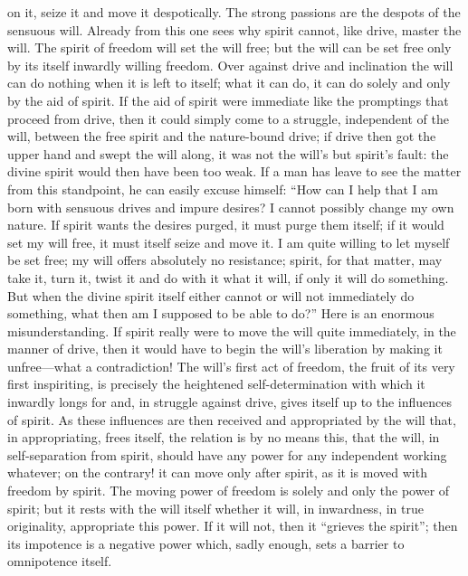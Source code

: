 \documentclass[12pt]{book}
\newcommand{\opage}[1]{\marginnote{\footnotesize\textit{[#1]}}}
\begin{document}
on it, seize it and move it despotically. The strong passions are the
despots of the sensuous will. Already from this one sees why spirit
cannot, like drive, master the will. The spirit of freedom will set the
will free; but the will can be set free only by its itself inwardly
willing freedom. Over against drive and
\opage{11}\setcounter{footnote}{0}%
inclination the will can do nothing when it is left to itself; what it
can do, it can do solely and only by the aid of spirit. If the aid of
spirit were immediate like the promptings that proceed from drive, then
it could simply come to a struggle, independent of the will, between
the free spirit and the nature-bound drive; if drive then got the upper
hand and swept the will along, it was not the will's but spirit's fault:
the divine spirit would then have been too weak. If a man has leave to
see the matter from this standpoint, he can easily excuse himself: ``How
can I help that I am born with sensuous drives and impure desires? I
cannot possibly change my own nature. If spirit wants the desires purged,
it must purge them itself; if it would set my will free, it must itself
seize and move it. I am quite willing to let myself be set free; my will
offers absolutely no resistance; spirit, for that matter, may take it,
turn it, twist it and do with it what it will, if only it will do
something. But when the divine spirit itself either cannot or will not
immediately do something, what then am I supposed to be able to do?''
Here is an enormous misunderstanding. If spirit really were to move the
will quite immediately, in the manner of drive, then it would have to
begin the will's liberation by making it unfree---what a contradiction!
The will's first act of freedom, the fruit of its very first
inspiriting, is precisely the heightened self-determination with which
it inwardly longs for and, in struggle against drive, gives itself up to
the influences of spirit. As these influences are then received and
appropriated by the will that, in appropriating, frees itself, the
relation is by no means this, that the will, in self-separation from
spirit, should have any power for any independent working whatever; on
the contrary! it can move only
\opage{12}\setcounter{footnote}{0}%
after spirit, as it is moved with freedom by spirit. The moving power of
freedom is solely and only the power of spirit; but it rests with the
will itself whether it will, in inwardness, in true originality,
appropriate this power. If it will not, then it ``grieves the spirit'';
then its impotence is a negative power which, sadly enough, sets a
barrier to omnipotence itself.
\end{document}

